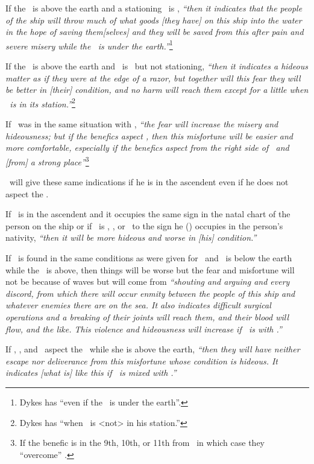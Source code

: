 If the \Moon\, is above the earth and a stationing \Saturn\, is \Trine, \textsl{``then it indicates that the people of the ship will throw much of what goods [they have] on this ship into the water in the hope of saving them[selves] and they will be saved from this after pain and severe misery while the \Moon\, is under the earth.''}\footnote{Dykes has ``even if the \Moon\, is under the earth''.}

If the \Moon\, is above the earth and \Saturn\, is \Trine\, but not stationing, \textsl{``then it indicates a hideous matter as if they were at the edge of a razor, but together will this fear they will be better in [their] condition, and no harm will reach them except for a little when \Saturn\, is in its station.''}\footnote{Dykes has ``when \Saturn\, is <not> in his station.''}

If \Saturn\, was in the same situation with \Mercury, \textsl{``the fear will increase the misery and hideousness; but if the benefics aspect \Saturn, then this misfortune will be easier and more comfortable, especially if the benefics aspect from the right side of \Saturn\, and [from] a strong place''}\footnote{If the benefic is in the 9th, 10th, or 11th from \Saturn\, in which case they ``overcome'' \Saturn.}

\Saturn\, will give these same indications if he is in the ascendent even if he does not aspect the \Moon.

If \Saturn\, is in the ascendent and it occupies the same sign in the natal chart of the person on the ship or if \Saturn\, is \Trine, \Square, or \Opposition\, to the sign he (\Saturn) occupies in the person's nativity, \textsl{``then it will be more hideous and worse in [his] condition.''}

If \Mars\, is found in the same conditions as were given for \Saturn\, and \Mars\, is below the earth while the \Moon\, is above, then things will be worse but the fear and misfortune will not be because of waves but will come from \textsl{``shouting and arguing and every discord, from which there will occur enmity between the people of this ship and whatever enemies there are on the sea. It also indicates difficult surgical operations and a breaking of their joints will reach them, and their blood will flow, and the like. This violence and hideousness will increase if \Mercury\, is with \Mars.''}

If \Saturn, \Mars, and \Mercury\, aspect the \Moon\, while she is above the earth, \textsl{``then they will have neither escape nor deliverance from this misfortune whose condition is hideous. It indicates [what is] like this if \Mars\, is mixed with \Mercury.''}

